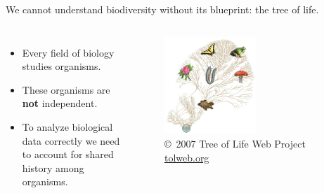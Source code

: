 


\begin{frame}
    \begin{adjustwidth}{-1.5em}{-1.5em}
    We cannot understand biodiversity without its blueprint: the tree of life.
    \begin{columns}


        \begin{itemize}
            \item Every field of biology studies organisms.
            \item These organisms are \textbf{not} independent.
            \item To analyze biological data correctly we need to account for
                shared history among organisms.
        \end{itemize}

        \begin{figure}
            \begin{center}
            \includegraphics[width=0.55\textwidth]{../images/treeoflife.jpg}
            \caption{\tiny \copyright~2007 Tree of Life Web Project \href{http://tolweb.org/tree/}{tolweb.org}}
            \end{center}
        \end{figure}
    
    \end{columns}
    \end{adjustwidth}
\end{frame}

